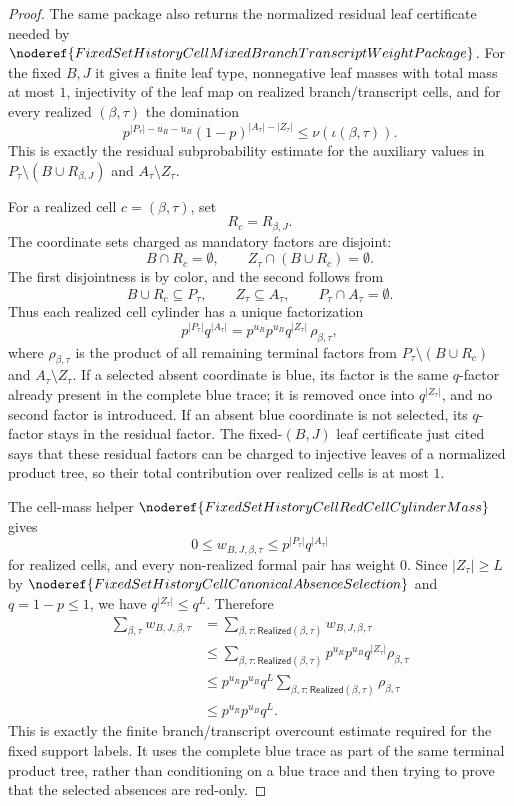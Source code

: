 \begin{proof}
The same package also returns the normalized residual leaf certificate
needed by \(\noderef{FixedSetHistoryCellMixedBranchTranscriptWeightPackage}\).
For the fixed \(B,J\) it gives a finite leaf type, nonnegative leaf masses
with total mass at most \(1\), injectivity of the leaf map on realized
branch/transcript cells, and for every realized \((\beta,\tau)\) the
domination
\[
p^{|P_\tau|-u_R-u_B}(1-p)^{|A_\tau|-|Z_\tau|}
  \le \nu(\iota(\beta,\tau)).
\]
This is exactly the residual subprobability estimate for the auxiliary
values in \(P_\tau\setminus(B\cup R_{\beta,J})\) and
\(A_\tau\setminus Z_\tau\).

For a realized cell \(c=(\beta,\tau)\), set
\[
R_c=R_{\beta,J}.
\]
The coordinate sets charged as mandatory factors are disjoint:
\[
B\cap R_c=\emptyset,\qquad
Z_\tau\cap(B\cup R_c)=\emptyset .
\]
The first disjointness is by color, and the second follows from
\[
B\cup R_c\subseteq P_\tau,\qquad Z_\tau\subseteq A_\tau,\qquad
P_\tau\cap A_\tau=\emptyset .
\]
Thus each realized cell cylinder has a unique factorization
\[
p^{|P_\tau|}q^{|A_\tau|}
=
p^{u_R}p^{u_B}q^{|Z_\tau|}\,\rho_{\beta,\tau},
\]
where \(\rho_{\beta,\tau}\) is the product of all remaining terminal factors
from \(P_\tau\setminus(B\cup R_c)\) and \(A_\tau\setminus Z_\tau\).  If a
selected absent coordinate is blue, its factor is the same \(q\)-factor
already present in the complete blue trace; it is removed once into
\(q^{|Z_\tau|}\), and no second factor is introduced.  If an absent blue
coordinate is not selected, its \(q\)-factor stays in the residual factor.
The fixed-\((B,J)\) leaf certificate just cited says that these residual
factors can be charged to injective leaves of a normalized product tree, so
their total contribution over realized cells is at most \(1\).

The cell-mass helper
\(\noderef{FixedSetHistoryCellRedCellCylinderMass}\) gives
\[
0\le w_{B,J,\beta,\tau}
\le p^{|P_\tau|}q^{|A_\tau|}
\]
for realized cells, and every non-realized formal pair has weight \(0\).
Since \(|Z_\tau|\ge L\) by
\(\noderef{FixedSetHistoryCellCanonicalAbsenceSelection}\) and \(q=1-p\le1\),
we have \(q^{|Z_\tau|}\le q^L\).  Therefore
\[
\begin{aligned}
\sum_{\beta,\tau}w_{B,J,\beta,\tau}
&=
\sum_{\beta,\tau:\mathsf{Realized}(\beta,\tau)}
  w_{B,J,\beta,\tau} \\
&\le
\sum_{\beta,\tau:\mathsf{Realized}(\beta,\tau)}
  p^{u_R}p^{u_B}q^{|Z_\tau|}\rho_{\beta,\tau} \\
&\le
p^{u_R}p^{u_B}q^L
\sum_{\beta,\tau:\mathsf{Realized}(\beta,\tau)}
  \rho_{\beta,\tau} \\
&\le p^{u_R}p^{u_B}q^L .
\end{aligned}
\]
This is exactly the finite branch/transcript overcount estimate required for
the fixed support labels.  It uses the complete blue trace as part of the
same terminal product tree, rather than conditioning on a blue trace and then
trying to prove that the selected absences are red-only.


\end{proof}

